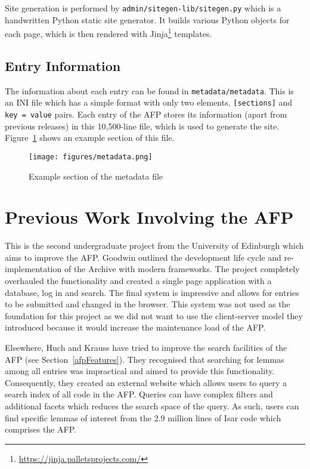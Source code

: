 \documentclass[bsc,frontabs,oneside,singlespacing,parskip,deptreport,logo]{infthesis}
\begin{document}
Site generation is performed by \verb|admin/sitegen-lib/sitegen.py| which is a handwritten Python static site generator. It builds various Python objects for each page, which is then rendered with Jinja\footnote{\url{https://jinja.palletsprojects.com/}} templates. 

\subsection{Entry Information}

The information about each entry can be found in \verb|metadata/metadata|. This is an INI file which has a simple format with only two elements, \verb|[sections]| and \verb|key = value| pairs. Each entry of the AFP stores its information (apart from previous releases) in this 10,500-line file, which is used to generate the site. Figure~\ref{metadata} shows an example section of this file.

\begin{figure}[h]
    \centering
    \texttt{[image: figures/metadata.png]}
    \caption{Example section of the metadata file}
    \label{metadata}
\end{figure}


\section{Previous Work Involving the AFP}

This is the second undergraduate project from the University of Edinburgh which aims to improve the AFP\@. Goodwin \cite{Goodwin2020} outlined the development life cycle and re-implementation of the Archive with modern frameworks. The project completely overhauled the functionality and created a single page application with a database, log in and search.  The final system is impressive and allows for entries to be submitted and changed in the browser. This system was not used as the foundation for this project as we did not want to use the client-server model they introduced because it would increase the maintenance load of the AFP\@.  %

Elsewhere, Huch and Krauss \cite{HuchKrauss} have tried to improve the search facilities of the AFP (see Section~\ref{afpFeatures}). They recognised that searching for lemmas among all entries was  impractical and aimed to provide this functionality. Consequently, they created an external website which allows users to query a search index of all code in the AFP\@. Queries can have complex filters and additional facets which reduces the search space of the query. As such, users can find specific lemmas of interest from the 2.9 million lines of Isar code which comprises the AFP.
\end{document}
